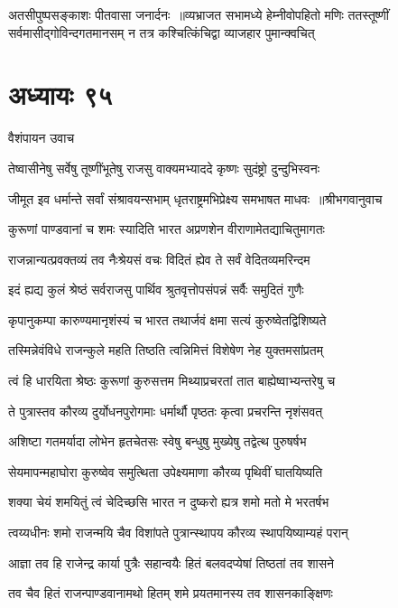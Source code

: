 अतसीपुष्पसङ्काशः पीतवासा जनार्दनः ॥व्यभ्राजत सभामध्ये हेम्नीवोपहितो मणिः
\twolineshloka
{ततस्तूष्णीं सर्वमासीद्गोविन्दगतमानसम्}
{न तत्र कश्चित्किंचिद्वा व्याजहार पुमान्क्वचित्}


\chapter{अध्यायः ९५}
\twolineshloka
{वैशंपायन उवाच}
{}


\twolineshloka
{तेष्वासीनेषु सर्वेषु तूष्णींभूतेषु राजसु}
{वाक्यमभ्याददे कृष्णः सुदंष्ट्रो दुन्दुभिस्वनः}


\threelineshloka
{जीमूत इव धर्मान्ते सर्वां संश्रावयन्सभाम्}
{धृतराष्ट्रमभिप्रेक्ष्य समभाषत माधवः ॥श्रीभगवानुवाच}
{}


\twolineshloka
{कुरूणां पाण्डवानां च शमः स्यादिति भारत}
{अप्रणशेन वीराणामेतद्याचितुमागतः}


\twolineshloka
{राजन्नान्यत्प्रवक्तव्यं तव नैःश्रेयसं वचः}
{विदितं ह्येव ते सर्वं वेदितव्यमरिन्दम}


\twolineshloka
{इदं ह्यद्य कुलं श्रेष्ठं सर्वराजसु पार्थिव}
{श्रुतवृत्तोपसंपन्नं सर्वैः समुदितं गुणैः}


\twolineshloka
{कृपानुकम्पा कारुण्यमानृशंस्यं च भारत}
{तथार्जवं क्षमा सत्यं कुरुष्वेतद्विशिष्यते}


\twolineshloka
{तस्मिन्नेवंविधे राजन्कुले महति तिष्ठति}
{त्वन्निमित्तं विशेषेण नेह युक्तमसांप्रतम्}


\twolineshloka
{त्वं हि धारयिता श्रेष्ठः कुरूणां कुरुसत्तम}
{मिथ्याप्रचरतां तात बाह्येष्वाभ्यन्तरेषु च}


\twolineshloka
{ते पुत्रास्तव कौरव्य दुर्योधनपुरोगमाः}
{धर्मार्थौ पृष्ठतः कृत्वा प्रचरन्ति नृशंसवत्}


\twolineshloka
{अशिष्टा गतमर्यादा लोभेन हृतचेतसः}
{स्वेषु बन्धुषु मुख्येषु तद्वेत्थ पुरुषर्षभ}


\twolineshloka
{सेयमापन्महाघोरा कुरुष्वेव समुत्थिता}
{उपेक्ष्यमाणा कौरव्य पृथिवीं घातयिष्यति}


\twolineshloka
{शक्या चेयं शमयितुं त्वं चेदिच्छसि भारत}
{न दुष्करो ह्यत्र शमो मतो मे भरतर्षभ}


\twolineshloka
{त्वय्यधीनः शमो राजन्मयि चैव विशांपते}
{पुत्रान्स्थापय कौरव्य स्थापयिष्याम्यहं परान्}


\twolineshloka
{आज्ञा तव हि राजेन्द्र कार्या पुत्रैः सहान्वयैः}
{हितं बलवदप्येषां तिष्ठतां तव शासने}


\twolineshloka
{तव चैव हितं राजन्पाण्डवानामथो हितम्}
{शमे प्रयतमानस्य तव शासनकाङ्क्षिणः}


